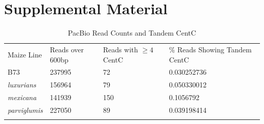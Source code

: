 
\newpage

\section*{Supplemental Material}

\begin{table}[h!]
\caption{PacBio Read Counts and Tandem CentC}
\label{supp.pacbio}       %
\begin{tabular}{llll}
\hline\noalign{\smallskip}
Maize Line & Reads over 600bp & Reads with $\geq 4$ CentC & \% Reads Showing Tandem CentC \\
\noalign{\smallskip}\hline\noalign{\smallskip}				
B73	& 237995	& 72	& 0.030252736	\\
\emph{luxurians}		&156964	&	79	&	0.050330012	\\
\emph{mexicana}	 	&141939 	&	150	&	0.1056792	\\
\emph{parviglumis}	&227050	& 89		&	0.039198414	\\
\noalign{\smallskip}\hline
\end{tabular}
\end{table}





